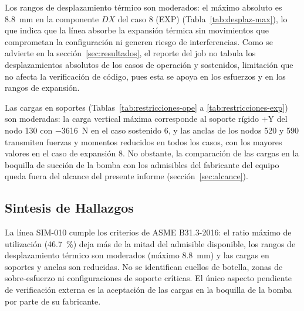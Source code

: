 Los rangos de desplazamiento t\'{e}rmico son moderados: el m\'{a}ximo
absoluto es 8.8~\si{mm} en la componente $DX$ del caso 8 (EXP)
(Tabla~\ref{tab:desplaz-max}), lo que indica que la l\'{i}nea absorbe la
expansi\'{o}n t\'{e}rmica sin movimientos que comprometan la configuraci\'{o}n
ni generen riesgo de interferencias. Como se advierte en la
secci\'{o}n~\ref{sec:resultados}, el reporte del job no tabula los
desplazamientos absolutos de los casos de operaci\'{o}n y sostenidos,
limitaci\'{o}n que no afecta la verificaci\'{o}n de c\'{o}digo, pues esta se
apoya en los esfuerzos y en los rangos de expansi\'{o}n.

Las cargas en soportes (Tablas~\ref{tab:restricciones-ope} a
\ref{tab:restricciones-exp}) son moderadas: la carga vertical m\'{a}xima
corresponde al soporte r\'{i}gido +Y del nodo 130 con \num{-3616}~\si{N} en
el caso sostenido 6, y las anclas de los nodos 520 y 590 transmiten fuerzas y
momentos reducidos en todos los casos, con los mayores valores en el caso de
expansi\'{o}n 8. No obstante, la comparaci\'{o}n de las cargas en la boquilla
de succi\'{o}n de la bomba con los admisibles del fabricante del equipo queda
fuera del alcance del presente informe (secci\'{o}n~\ref{sec:alcance}).

\subsection{Sintesis de Hallazgos}

La l\'{i}nea SIM-010 cumple los criterios de ASME B31.3-2016: el ratio
m\'{a}ximo de utilizaci\'{o}n (46.7~\%) deja m\'{a}s de la mitad del
admisible disponible, los rangos de desplazamiento t\'{e}rmico son moderados
(m\'{a}ximo 8.8~\si{mm}) y las cargas en soportes y anclas son reducidas. No
se identifican cuellos de botella, zonas de sobre-esfuerzo ni configuraciones
de soporte cr\'{i}ticas. El \'{u}nico aspecto pendiente de verificaci\'{o}n
externa es la aceptaci\'{o}n de las cargas en la boquilla de la bomba por
parte de su fabricante.
